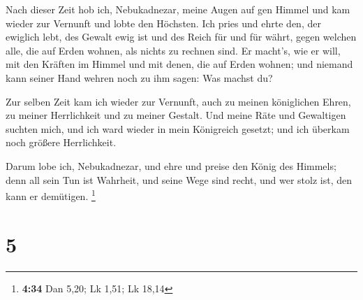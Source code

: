  Nach dieser Zeit hob ich, Nebukadnezar, meine Augen auf
gen Himmel und kam wieder zur Vernunft und lobte den Höchsten. Ich pries
und ehrte den, der ewiglich lebt, des Gewalt ewig ist und des Reich für
und für währt,  gegen welchen alle, die auf Erden wohnen,
als nichts zu rechnen sind. Er macht's, wie er will, mit den Kräften im
Himmel und mit denen, die auf Erden wohnen; und niemand kann seiner Hand
wehren noch zu ihm sagen: Was machst du?

 Zur selben Zeit kam ich wieder zur Vernunft, auch zu
meinen königlichen Ehren, zu meiner Herrlichkeit und zu meiner Gestalt.
Und meine Räte und Gewaltigen suchten mich, und ich ward wieder in mein
Königreich gesetzt; und ich überkam noch größere Herrlichkeit.

 Darum lobe ich, Nebukadnezar, und ehre und preise den
König des Himmels; denn all sein Tun ist Wahrheit, und seine Wege sind
recht, und wer stolz ist, den kann er demütigen. \footnote{\textbf{4:34}
  Dan 5,20; Lk 1,51; Lk 18,14}

\hypertarget{section-3}{%
\section{5}\label{section-3}}

